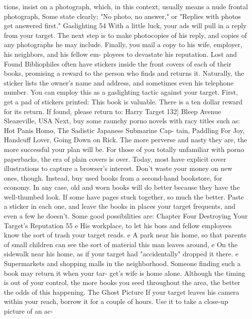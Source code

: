 \documentclass{book}
\begin{document}
tions, insist on a photograph, which, in this context, usually 
means a nude frontal photograph, Some state clearly; "No 
photo, no answer," or "Replies with photos get answered first."  Gaslighting 
54 
With a little luck, your ads will pull in a reply from your 
target. The next step is to make photocopies of his reply, and 
copies of any photographs he may include. Finally, you mail a 
copy to his wife, employer, his neighbors, and his fellow em- 
ployees to devastate his reputation. 
Lost and Found 
Bibliophiles often have stickers inside the front covers of 
each of their books, promising a reward to the person who finds 
and returns it. Naturally, the sticker lists the owner's name and 
address, and sometimes even his telephone number. You can 
employ this as a gaslighting tactic against your target. First, get 
a pad of stickers printed: 
This book is valuable. There is a ten dollar reward for 
its return. If found, please return to: 
Harry Target 
132] Bleep Avenue 
Sleazeville, USA 
Next, buy some raunchy porno novels with racy titles such 
as: Hot Panis Homo, The Sadistic Japanese Submarine Cap- 
tain, Paddling For Joy, Handcuff Lover, Going Down on Rick. 
The more perverse and nasty they are, the more successful 
your plan will be. For those of you totally unfamiliar with porno 
paperbacks, the era of plain covers is over. Today, most have 
explicit cover illustrations to capture a browser's interest. 
Don't waste your money on new ones, though. Instead, buy 
used books from a second-hand bookstore, for economy. In any 
case, old and worn books will do better because they have the 
well-thumbed look. If some have pages stuck together, so much 
the better. Paste a sticker in each one, and leave the books in 
places your target frequents, and even a few he doesn't. Some 
good possibilities are: 
Chapter Four 
Destroying Your Target's Reputation 
55 
e His workplace, to let his boss and fellow employees know 
the sort of trash your target reads. 
e A park near his home, so that parents of small children can 
see the sort of material this man leaves around, 
e On the sidewalk near his home, as if your target had 
"accidentally" dropped it there. 
e Supermarkets and shopping malls in the neighborhood. 
Someone finding such a book may return it when your tar- 
get's wife is home alone. Although the timing is out of your 
control, the more books you seed throughout the area, the better 
the odds of this happening. 
The Ghost Picture 
If your target leaves his camera within your reach, borrow it 
for a couple of hours. Use it to take a close-up picture of an ac- 
\end{document}
